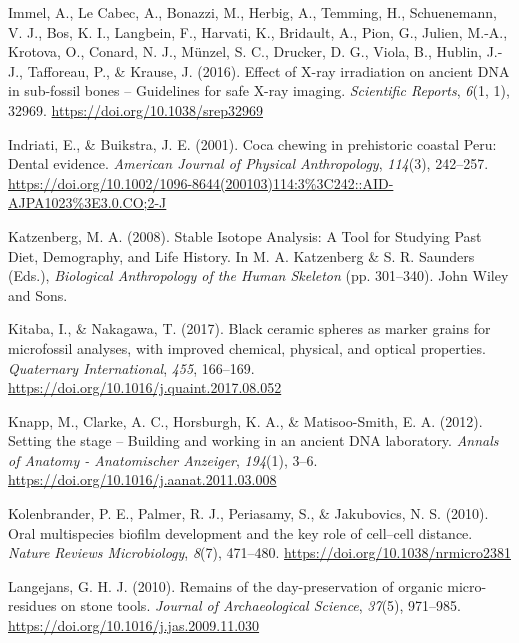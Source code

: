 \documentclass[
  letterpaper,
]{book}
\newlength{\cslhangindent}
\newlength{\cslentryspacingunit} %
\newenvironment{CSLReferences}[2] %
 {%
  \setlength{\parindent}{0pt}
  \ifodd #1
  \let\oldpar\par
  \def\par{\hangindent=\cslhangindent\oldpar}
  \fi
  \setlength{\parskip}{#2\cslentryspacingunit}
 }%
 {}
\begin{document}
\begin{CSLReferences}{1}{0}
\leavevmode{}%
Immel, A., Le Cabec, A., Bonazzi, M., Herbig, A., Temming, H.,
Schuenemann, V. J., Bos, K. I., Langbein, F., Harvati, K., Bridault, A.,
Pion, G., Julien, M.-A., Krotova, O., Conard, N. J., Münzel, S. C.,
Drucker, D. G., Viola, B., Hublin, J.-J., Tafforeau, P., \& Krause, J.
(2016). Effect of {X-ray} irradiation on ancient {DNA} in sub-fossil
bones -- {Guidelines} for safe {X-ray} imaging. \emph{Scientific
Reports}, \emph{6}(1, 1), 32969. \url{https://doi.org/10.1038/srep32969}

\leavevmode{}%
Indriati, E., \& Buikstra, J. E. (2001). Coca chewing in prehistoric
coastal {Peru}: {Dental} evidence. \emph{American Journal of Physical
Anthropology}, \emph{114}(3), 242--257.
\url{https://doi.org/10.1002/1096-8644(200103)114:3\%3C242::AID-AJPA1023\%3E3.0.CO;2-J}

\leavevmode{}%
Katzenberg, M. A. (2008). Stable {Isotope Analysis}: {A Tool} for
{Studying Past Diet}, {Demography}, and {Life History}. In M. A.
Katzenberg \& S. R. Saunders (Eds.), \emph{Biological {Anthropology} of
the {Human Skeleton}} (pp. 301--340). {John Wiley and Sons}.

\leavevmode{}%
Kitaba, I., \& Nakagawa, T. (2017). Black ceramic spheres as marker
grains for microfossil analyses, with improved chemical, physical, and
optical properties. \emph{Quaternary International}, \emph{455},
166--169. \url{https://doi.org/10.1016/j.quaint.2017.08.052}

\leavevmode{}%
Knapp, M., Clarke, A. C., Horsburgh, K. A., \& Matisoo-Smith, E. A.
(2012). Setting the stage -- {Building} and working in an ancient {DNA}
laboratory. \emph{Annals of Anatomy - Anatomischer Anzeiger},
\emph{194}(1), 3--6. \url{https://doi.org/10.1016/j.aanat.2011.03.008}

\leavevmode{}%
Kolenbrander, P. E., Palmer, R. J., Periasamy, S., \& Jakubovics, N. S.
(2010). Oral multispecies biofilm development and the key role of
cell--cell distance. \emph{Nature Reviews Microbiology}, \emph{8}(7),
471--480. \url{https://doi.org/10.1038/nrmicro2381}

\leavevmode{}%
Langejans, G. H. J. (2010). Remains of the day-preservation of organic
micro-residues on stone tools. \emph{Journal of Archaeological Science},
\emph{37}(5), 971--985. \url{https://doi.org/10.1016/j.jas.2009.11.030}


\end{CSLReferences}
\end{document}
